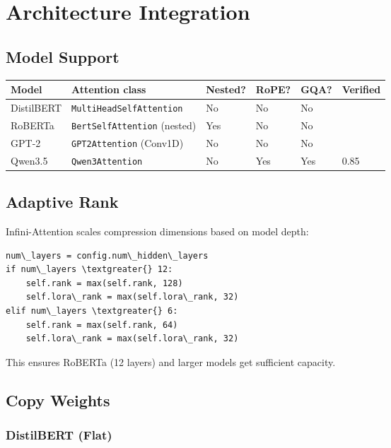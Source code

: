 
\section{Architecture Integration}

\subsection{Model Support}

\begin{table}[H]
\centering
\small
\begin{tabular}{llllll}
\toprule
\textbf{Model} & \textbf{Attention class} & \textbf{Nested?} & \textbf{RoPE?} & \textbf{GQA?} & \textbf{Verified} \\
\midrule
DistilBERT & \texttt{MultiHeadSelfAttention} & No & No & No &  \\
RoBERTa & \texttt{BertSelfAttention} (nested) & Yes & No & No &  \\
GPT-2 & \texttt{GPT2Attention} (Conv1D) & No & No & No &  \\
Qwen3.5 & \texttt{Qwen3Attention} & No & Yes & Yes & 0.85 \\
\bottomrule
\end{tabular}
\end{table}

\subsection{Adaptive Rank}

Infini-Attention scales compression dimensions based on model depth:

\begin{lstlisting}
num\_layers = config.num\_hidden\_layers
if num\_layers \textgreater{} 12:
    self.rank = max(self.rank, 128)
    self.lora\_rank = max(self.lora\_rank, 32)
elif num\_layers \textgreater{} 6:
    self.rank = max(self.rank, 64)
    self.lora\_rank = max(self.lora\_rank, 32)
\end{lstlisting}

This ensures RoBERTa (12 layers) and larger models get sufficient 
capacity.

\subsection{Copy Weights}

\subsubsection{DistilBERT (Flat)}

